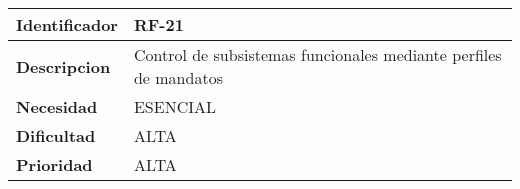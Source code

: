 \begin{center}
    \begin{tabular}{|p{2.6cm}|p{12cm}|}
    \hline
    \textbf{Identificador} & RF-21\\
    \hline
    \textbf{Descripcion} & Control de subsistemas funcionales mediante perfiles de mandatos\\
    \hline
    \textbf{Necesidad} & ESENCIAL\\
    \hline
    \textbf{Dificultad} & ALTA\\
    \hline
    \textbf{Prioridad} & ALTA\\
    \hline
    \end{tabular}
\end{center}
